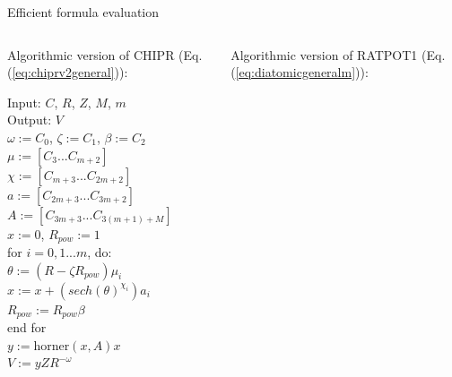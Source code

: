 \documentclass{beamer}
\newcommand\Fontvi{\fontsize{8}{7.2}\selectfont} %
\newenvironment{ppl}{\fontfamily{ppl}\selectfont}{\par}
\def\spc{\hspace*{0.5cm}} 			%
\begin{document}
\iffalse
\begin{frame}{Efficient formula evaluation}
    \Fontvi
    \begin{columns}[c]
        \begin{column}{0.5\textwidth}
            Algorithmic version of CHIPR (Eq.(\ref{eq:chiprv2general})):
            \begin{ppl}
            
                \vspace{0.2cm}
                Input: $C$, $R$, $Z$, $M$, $m$\\
                Output: $V$ \\
                $\omega := C_0$, $\zeta := C_1$, $\beta := C_2$ \\
                $\mu := [C_3...C_{m+2}]$ \\
                $\chi := [C_{m+3}...C_{2m+2}]$ \\
                $a := [C_{2m+3}...C_{3m+2}]$ \\
                $A := [C_{3m+3}...C_{3(m+1)+M}]$ \\
                $x := 0$, $R_{pow} := 1$\\ 
                for $i=0,1 ... m$, do:\\
                    \spc $\theta := (R - \zeta R_{pow})\mu_i$\\
                    \spc $x := x + (sech(\theta)^{\chi_i})a_i$\\
                    \spc $R_{pow} := R_{pow}\beta$\\
                end for \\
                $y := \text{horner}(x, A)x$\\
                $V := yZR^{-\omega}$
            \end{ppl}
        \end{column}
        \vrule{}
        \begin{column}{0.5\textwidth}
            Algorithmic version of RATPOT1  (Eq.(\ref{eq:diatomicgeneralm})):
            \vspace{0.2cm}
            \begin{ppl}
                

\end{ppl}
\end{column}
\end{columns}
\end{frame}
\end{document}
